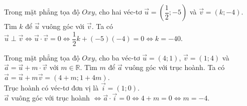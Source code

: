 
\begin{bt}%
	Trong mặt phẳng tọa độ $Oxy$, cho hai véc-tơ $\overrightarrow{u}=\left (\dfrac{1}{2};-5 \right )$ và $\overrightarrow{v}=\left (k;-4 \right )$. Tìm $k$ để $\overrightarrow{u}$ vuông góc với $\overrightarrow{v}$.
	\loigiai
	{
		Ta có $\overrightarrow{u}\perp\overrightarrow{v}\Leftrightarrow\overrightarrow{u}\cdot\overrightarrow{v}=0\Leftrightarrow \dfrac{1}{2}k+(-5)(-4)=0\Leftrightarrow k=-40.$
	}
\end{bt}

\begin{bt}%
	Trong mặt phẳng tọa độ $Oxy$, cho ba véc-tơ $\overrightarrow{u}=(4;1)$, $\overrightarrow{v}=(1;4)$ và $\overrightarrow{a}=\overrightarrow{u}+m\cdot\overrightarrow{v}$ với $m\in\mathbb{R}$. Tìm $m$ để $\overrightarrow{a}$ vuông góc với trục hoành.
	\loigiai
	{
		Ta có $\overrightarrow{a}=\overrightarrow{u}+m\overrightarrow{v}=\left (4+m;1+4m \right )$.\\
		Trục hoành có véc-tơ đơn vị là $\overrightarrow{i}=(1;0)$.\\
		$\overrightarrow{a}$ vuông góc với trục hoành $\Leftrightarrow \overrightarrow{a}\cdot\overrightarrow{i}=0\Leftrightarrow 4+m=0\Leftrightarrow m=-4$.
	}
\end{bt}

